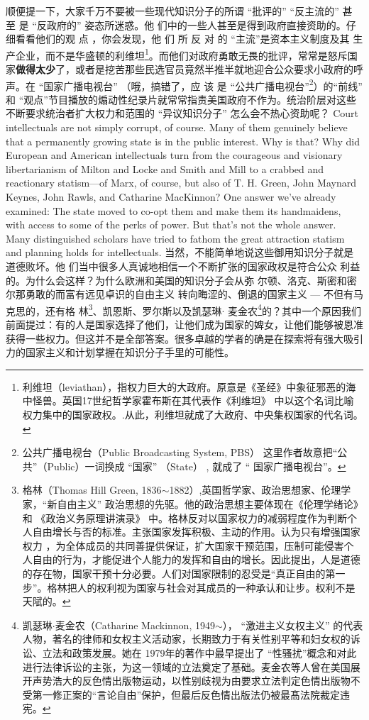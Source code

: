 \begin{paracol}{2}
顺便提一下，大家千万不要被一些现代知识分子的所谓
“批评的” “反主流的” 甚 至 是 “反政府的” 姿态所迷惑。他
们中的一些人甚至是得到政府直接资助的。仔细看看他们的观
点 ，你会发现，他 们 所 反 对 的 “主流”是资本主义制度及其
生产企业，而不是华盛顿的利维坦\footnote{利维坦（leviathan），指权力巨大的大政府。原意是《圣经》中象征邪恶的海中怪兽。英国17世纪哲学家霍布斯在其代表作《利维坦》 中以这个名词比喻权力集中的国家政权。.从此，利维坦就成了大政府、中央集权国家的代名词。}。而他们对政府勇敢无畏的批评，常常是怒斥国家\textbf{做得太少}了，或者是挖苦那些民选官员竟然半推半就地迎合公众要求小政府的呼声。在 “国家广播电视台” （哦，搞错了，应 该 是 “公共广播电视台”\footnote{公共广播电视台（Public Broadcasting System, PBS） 这里作者故意把“公共”（Public）一词换成 “国家” （State） , 就成了 “ 国家广播电视台”。}）的“前线” 和 “观点”节目播放的煽动性纪录片就常常指责美国政府不作为。统治阶层对这些不断要求统治者扩大权力和范围的 “异议知识分子” 怎么会不热心资助呢？  
\switchcolumn*
Court intellectuals are not simply corrupt, of course. Many of
them genuinely believe that a permanently growing state is in
the public interest. Why is that? Why did European and American intellectuals turn from the courageous and visionary libertarianism of Milton and Locke and Smith and Mill to a crabbed
and reactionary statism---of Marx, of course, but also of T. H.
Green, John Maynard Keynes, John Rawls, and Catharine
MacKinnon? One answer we've already examined: The state
moved to co-opt them and make them its handmaidens, with
access to some of the perks of power. But that's not the whole
answer. Many distinguished scholars have tried to fathom the
great attraction statism and planning holds for intellectuals.
\switchcolumn
当然，不能简单地说这些御用知识分子就是道德败坏。他
们当中很多人真诚地相信一个不断扩张的国家政权是符合公众
利益的。为什么会这样？为什么欧洲和美国的知识分子会从弥
尔顿、洛克、斯密和密尔那勇敢的而富有远见卓识的自由主义
转向晦涩的、倒退的国家主义 --- 不但有马克思的，还有格
林\footnote{格林（Thomas Hill Green, 1836$\sim$1882）,英国哲学家、政治思想家、伦理学家，“新自由主义” 政治思想的先驱。他的政治思想主要体现在《伦理学绪论》和 《政治义务原理讲演录》 中。格林反对以国家权力的减弱程度作为判断个人自由增长与否的标准。主张国家发挥积极、主动的作用。认为只有增强国家权力 ，为全体成员的共同善提供保证，扩大国家干预范围，压制可能侵害个人自由的行为，才能促进个人能力的发挥和自由的增长。因此提出，人是道德的存在物，国家干预十分必要。人们对国家限制的忍受是“真正自由的第一步”。格林把人的权利视为国家与社会对其成员的一种承认和让步。权利不是天陚的。}、凯恩斯、罗尔斯以及凯瑟琳$\cdot$ 麦金农\footnote{凯瑟琳$\cdot$麦金农（Catharine Mackinnon, 1949$\sim$）， “激进主义女权主义” 的代表人物，著名的律师和女权主义活动家，长期致力于有关性别平等和妇女权的诉讼、立法和政策发展。她在 1979年的著作中最早提出了 “性骚扰”概念和对此进行法律诉讼的主张，为这一领域的立法奠定了基础。麦金农等人曾在美国展开声势浩大的反色情出版物运动，以性别歧视为由要求立法判定色情出版物不受第一修正案的“言论自由”保护，但最后反色情出版法仍被最髙法院裁定违宪。}的？其中一个原因我们前面提过：有的人是国家选择了他们，让他们成为国家的婢女，让他们能够被恩准获得一些权力。但这并不是全部答案。很多卓越的学者的确是在探索将有强大吸引力的国家主义和计划掌握在知识分子手里的可能性。

\end{paracol}
